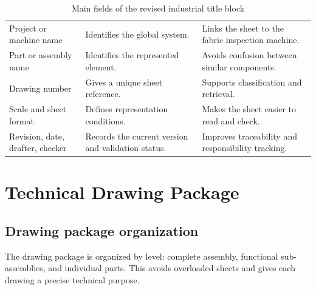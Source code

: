 \begin{table}[H]
\centering
\small
\caption{Main fields of the revised industrial title block}
\label{tab:chapter2-5}
\begin{tabularx}{\textwidth}{|P{0.25\textwidth}|P{0.34\textwidth}|Y|}
\hline
{}
 &  &  \\
\hline
Project or machine name & Identifies the global system. & Links the sheet to the fabric inspection machine. \\
\hline
Part or assembly name & Identifies the represented element. & Avoids confusion between similar components. \\
\hline
Drawing number & Gives a unique sheet reference. & Supports classification and retrieval. \\
\hline
Scale and sheet format & Defines representation conditions. & Makes the sheet easier to read and check. \\
\hline
Revision, date, drafter, checker & Records the current version and validation status. & Improves traceability and responsibility tracking. \\
\hline
\end{tabularx}
\end{table}

\section{Technical Drawing Package}

\subsection{Drawing package organization}

The drawing package is organized by level: complete assembly, functional sub-assemblies, and individual parts. This avoids overloaded sheets and gives each drawing a precise technical purpose.


